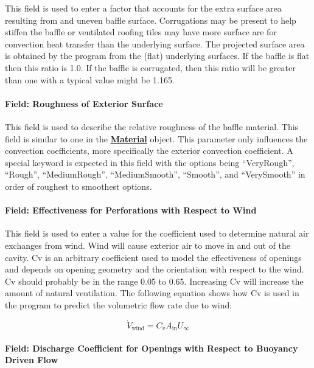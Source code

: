 This field is used to enter a factor that accounts for the extra surface area resulting from and uneven baffle surface. Corrugations may be present to help stiffen the baffle or ventilated roofing tiles may have more surface are for convection heat transfer than the underlying surface. The projected surface area is obtained by the program from the (flat) underlying surfaces. If the baffle is flat then this ratio is 1.0. If the baffle is corrugated, then this ratio will be greater than one with a typical value might be 1.165.

\paragraph{Field: Roughness of Exterior Surface}\label{field-roughness-of-exterior-surface}

This field is used to describe the relative roughness of the baffle material. This field is similar to one in the \textbf{\hyperref[material]{Material}} object. This parameter only influences the convection coefficients, more specifically the exterior convection coefficient. A special keyword is expected in this field with the options being ``VeryRough'', ``Rough'', ``MediumRough'', ``MediumSmooth'', ``Smooth'', and ``VerySmooth'' in order of roughest to smoothest options.

\paragraph{Field: Effectiveness for Perforations with Respect to Wind}\label{field-effectiveness-for-perforations-with-respect-to-wind}

This field is used to enter a value for the coefficient used to determine natural air exchanges from wind. Wind will cause exterior air to move in and out of the cavity. Cv is an arbitrary coefficient used to model the effectiveness of openings and depends on opening geometry and the orientation with respect to the wind. Cv should probably be in the range 0.05 to 0.65. Increasing Cv will increase the amount of natural ventilation. The following equation shows how Cv is used in the program to predict the volumetric flow rate due to wind:

\begin{equation}
  \dot{V}_{\mathrm{wind}} = C_v A_{\mathrm{in}} U_{\infty}
\end{equation}

\paragraph{Field: Discharge Coefficient for Openings with Respect to Buoyancy Driven Flow}\label{field-discharge-coefficient-for-openings-with-respect-to-buoyancy-driven-flow}

